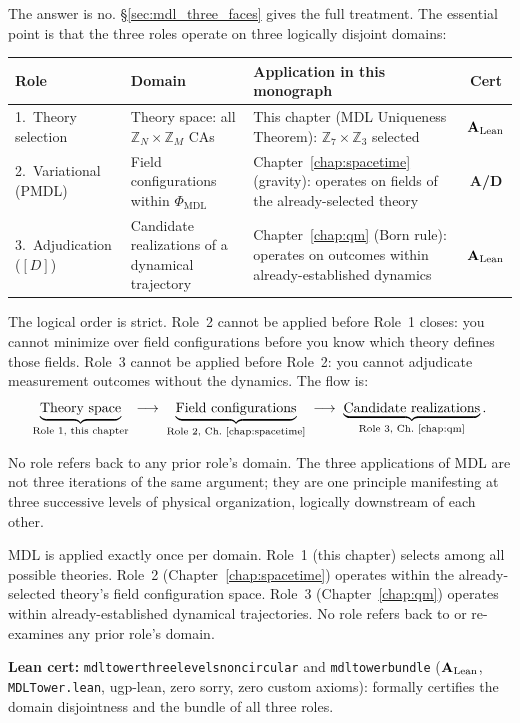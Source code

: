 \documentclass[11pt,openany]{book}
\theoremstyle{remark}
\newcommand{\PHIMDL}{\Phi_{\mathrm{MDL}}}
\newcommand{\lean}[1]{%
  \penalty-100
  \begingroup\def\_{\textunderscore\allowbreak}\texttt{#1}\endgroup}
\newcommand{\CatAL}{\ensuremath{\textbf{A}_{\rm Lean}}}
\newcommand{\CatAD}{\textbf{A/D}}
\begin{document}
The answer is no. \S\ref{sec:mdl_three_faces} gives the full treatment. The essential
point is that the three roles operate on three logically disjoint domains:

\begin{center}
\begin{tabular}{@{}P{2.8cm}P{3.5cm}P{5.0cm}c@{}}
\toprule
\textbf{Role} & \textbf{Domain} & \textbf{Application in this monograph} & \textbf{Cert} \\
.\ Theory selection & Theory space: all $\mathbb{Z}_N\times\mathbb{Z}_M$ CAs &
This chapter (MDL Uniqueness Theorem): $\mathbb{Z}_7\times\mathbb{Z}_3$ selected & \CatAL \\[4pt]
2.\ Variational (PMDL) & Field configurations within $\PHIMDL$ &
Chapter~\ref{chap:spacetime} (gravity): operates on fields of the already-selected theory &
\CatAD \\[4pt]
3.\ Adjudication ($[D]$) & Candidate realizations of a dynamical trajectory &
Chapter~\ref{chap:qm} (Born rule): operates on outcomes within already-established dynamics &
\CatAL \\
\bottomrule
\end{tabular}
\end{center}

The logical order is strict. Role~2 cannot be applied before Role~1 closes: you
cannot minimize over field configurations before you know which theory defines those
fields. Role~3 cannot be applied before Role~2: you cannot adjudicate measurement
outcomes without the dynamics. The flow is:
\[
\underbrace{\text{Theory space}}_{\text{Role 1, this chapter}}
\;\longrightarrow\;
\underbrace{\text{Field configurations}}_{\text{Role 2, Ch.~\ref{chap:spacetime}}}
\;\longrightarrow\;
\underbrace{\text{Candidate realizations}}_{\text{Role 3, Ch.~\ref{chap:qm}}}.
\]

No role refers back to any prior role's domain. The three applications of MDL are not
three iterations of the same argument; they are one principle manifesting at three
successive levels of physical organization, logically downstream of each other.

\begin{tcolorbox}[colback=yellow!8,colframe=yellow!60!black,
  title={Non-Circularity Statement (\CatAL)}]
MDL is applied exactly once per domain. Role~1 (this chapter) selects among all
possible theories. Role~2 (Chapter~\ref{chap:spacetime}) operates within the
already-selected theory's field configuration space. Role~3
(Chapter~\ref{chap:qm}) operates within already-established dynamical trajectories.
No role refers back to or re-examines any prior role's domain.

\smallskip\noindent
\textbf{Lean cert:} \lean{mdl\_tower\_three\_levels\_non\_circular} and
\lean{mdl\_tower\_bundle} (\CatAL, \texttt{MDLTower.lean}, ugp-lean, zero sorry,
zero custom axioms): formally certifies the domain disjointness and the bundle of
all three roles.
\end{tcolorbox}
\end{document}
